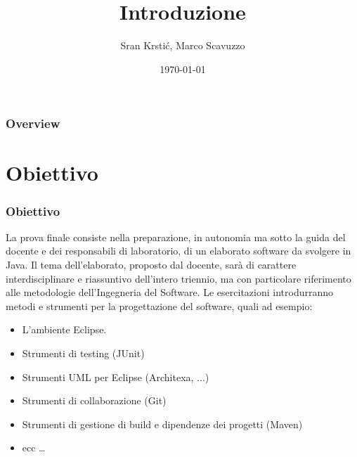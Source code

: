 \documentclass{beamer}
\title[Introduzione]{Introduzione} %
\author{Sr\dj{}an Krsti\'c, Marco Scavuzzo} %
\institute[] %
{
Politecnico di Milano \\ %
\medskip
\textit{srdan.krstic@polimi.it, marco.scavuzzo@.polimi.it} %
}
\date{\today} %
\begin{document}
\begin{frame}
\titlepage %
\end{frame}

\begin{frame}
\frametitle{Overview} %
\tableofcontents %
\end{frame}



\section{Obiettivo}
\begin{frame}
\frametitle{Obiettivo}
La prova finale consiste nella preparazione, in autonomia ma sotto la guida del docente e dei responsabili di laboratorio, di un elaborato software da svolgere in Java. Il tema dell'elaborato,  proposto dal docente, sar\`a  di carattere interdisciplinare e riassuntivo dell'intero triennio, ma con particolare riferimento alle metodologie dell'Ingegneria del Software. Le esercitazioni introdurranno metodi e strumenti per la progettazione del software, quali ad esempio:
\begin{itemize}
\item L'ambiente Eclipse.
\item Strumenti di testing (JUnit)
\item Strumenti UML per Eclipse (Architexa, ...)
\item Strumenti di collaborazione (Git)
\item Strumenti di gestione di build e dipendenze  dei progetti (Maven)
\item ecc \ldots
\end{itemize}
\end{frame}
\end{document}
